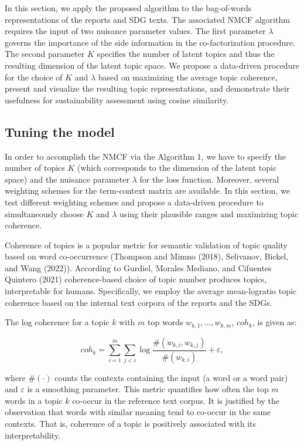 \documentclass[
]{article}
\begin{document}
In this section, we apply the proposed algorithm to the bag-of-words representations of the reports and SDG texts. The associated NMCF algorithm requires the input of two nuisance parameter values. The first parameter \(\lambda\) governs the importance of the side information in the co-factorization procedure. The second parameter \(K\) specifies the number of latent topics and thus the resulting dimension of the latent topic space. We propose a data-driven procedure for the choice of \(K\) and \(\lambda\) based on maximizing the average topic coherence, present and visualize the resulting topic representations, and demonstrate their usefulness for sustainability assessment using cosine similarity.

\hypertarget{tuning-the-model}{%
\subsection{Tuning the model}\label{tuning-the-model}}

In order to accomplish the NMCF via the Algorithm 1, we have to specify the number of topics \(K\) (which corresponds to the dimension of the latent topic space) and the nuisance parameter \(\lambda\) for the loss function. Moreover, several weighting schemes for the term-context matrix are available. In this section, we test different weighting schemes and propose a data-driven procedure to simultaneously choose \(K\) and \(\lambda\) using their plausible ranges and maximizing topic coherence.

Coherence of topics is a popular metric for semantic validation of topic quality based on word co-occurrence (Thompson and Mimno (2018), Selivanov, Bickel, and Wang (2022)). According to Gurdiel, Morales Mediano, and Cifuentes Quintero (2021) coherence-based choice of topic number produces topics, interpretable for humans. Specifically, we employ the average mean-logratio topic coherence based on the internal text corpora of the reports and the SDGs.

The log coherence for a topic \(k\) with \(m\) top words \(w_{k,1},\ldots, w_{k,m}\), \(coh_k\), is given as:

\begin{equation}
coh_{k}=\sum_{i=1}^m\sum_{j<i}\log\frac{\#(w_{k,i},w_{k,j})}{\#(w_{k,i})}+\varepsilon,\label{eq:coh}
\end{equation}

where \(\#(\cdot)\) counts the contexts containing the input (a word or a word pair) and \(\varepsilon\) is a smoothing parameter. This metric quantifies how often the top \(m\) words in a topic \(k\) co-occur in the reference text corpus. It is justified by the observation that words with similar meaning tend to co-occur in the same contexts. That is, coherence of a topic is positively associated with its interpretability.
\end{document}
